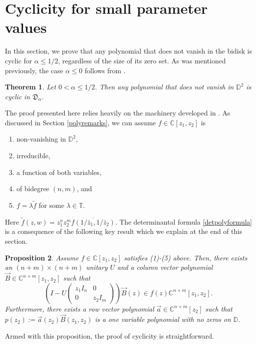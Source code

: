 \documentclass[11 pt,reqno]{amsart}
\newtheorem{thm}{Theorem}[section]
\newtheorem{prop}[thm]{Proposition}
\theoremstyle{definition}
\theoremstyle{remark}
\numberwithin{equation}{section} \numberwithin{figure}{section}
\begin{document}
\section{Cyclicity for small parameter values}\label{smallalpha}
In this section, we prove that any polynomial that does not vanish in
the bidisk is cyclic for $\alpha\leq 1/2$, regardless of the size of
its zero set.  As was mentioned previously, the case $\alpha \leq 0$
follows from \cite{NGN}.  

\begin{thm}\label{smallalphathm}
Let $0< \alpha \leq 1/2$.
Then any polynomial that does not vanish in ${{\mathbb D}}^2$ is cyclic in $\mathfrak{D}_{\alpha}$.
\end{thm}

The proof presented here relies heavily on the machinery developed in
\cite{Kne09, Kne10}.  As discussed in Section \ref{polyremarks}, we
can assume $f\in {{\mathbb C}}[z_1,z_2]$ is
\begin{enumerate}
\item non-vanishing in ${{\mathbb D}}^2$,
\item irreducible, 
\item a function of both variables, 
\item of bidegree $(n,m)$, and 
\item $f = \lambda \tilde{f}$ for some $\lambda \in {{\mathbb T}}$.
\end{enumerate}
Here $\tilde{f}(z,w) = z_1^n z_2^m \overline{f(1/\bar{z}_1,
  1/\bar{z}_2)}$. The determinantal formula \eqref{detpolyformula} is
a consequence of the following key result which we explain at the end
of this section.

\begin{prop} \label{backgroundprop} Assume $f\in {{\mathbb C}}[z_1,z_2]$
  satisfies (1)-(5) above.  Then, there exists an $(n+m)\times(n+m)$
  unitary $U$ and a column vector polynomial $\vec{B} \in
  {{\mathbb C}}^{n+m}[z_1,z_2]$ such that
\[
\left(I-U \begin{pmatrix} z_1 I_n & 0 \\ 0 & z_2
  I_m \end{pmatrix}\right) \vec{B}(z) \in f(z)  {{\mathbb C}}^{n+m}[z_1,z_2].
\]
Furthermore, there exists a row vector polynomial $\vec{a} \in
{{\mathbb C}}^{n+m}[z_2]$ such that $p(z_2):= \vec{a}(z_2) \vec{B}(z_1,z_2)$ is a
one variable polynomial with no zeros on ${{\mathbb D}}$.  
\end{prop}

Armed with this proposition, the proof of cyclicity is
straightforward.
\end{document}
